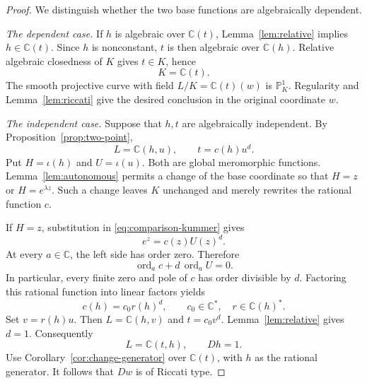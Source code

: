 \documentclass[10pt,a4paper]{amsart}
\newcommand{\C}{\mathbb C}
\newcommand{\PP}{\mathbb P}
\newcommand{\ord}{\operatorname{ord}}
\begin{document}
\begin{proof}
We distinguish whether the two base functions are algebraically
dependent.

\smallskip\noindent
\emph{The dependent case.}
If $h$ is algebraic over $\C(t)$, Lemma~\ref{lem:relative} implies
$h\in\C(t)$. Since $h$ is nonconstant, $t$ is then algebraic over
$\C(h)$. Relative algebraic closedness of $K$ gives $t\in K$, hence
\begin{equation}
 K=\C(t).
 \label{eq:equal-bases}
\end{equation}
The smooth projective curve with field $L/K=\C(t)(w)$ is
$\PP^1_K$. Regularity and Lemma~\ref{lem:riccati} give the desired
conclusion in the original coordinate $w$.

\smallskip\noindent
\emph{The independent case.}
Suppose that $h,t$ are algebraically independent. By
Proposition~\ref{prop:two-point},
\begin{equation}
 L=\C(h,u),\qquad t=c(h)u^d.
 \label{eq:comparison-kummer}
\end{equation}
Put $H=\iota(h)$ and $U=\iota(u)$. Both are global meromorphic
functions. Lemma~\ref{lem:autonomous} permits a change of the base
coordinate so that $H=z$ or $H=e^{\lambda z}$. Such a change leaves
$K$ unchanged and merely rewrites the rational function $c$.

If $H=z$, substitution in \eqref{eq:comparison-kummer} gives
\begin{equation}
 e^z=c(z)U(z)^d.
 \label{eq:additive-divisor-identity}
\end{equation}
At every $a\in\C$, the left side has order zero. Therefore
\[
 \ord_a c+d\,\ord_a U=0.
\]
In particular, every finite zero and pole of $c$ has order divisible
by $d$. Factoring this rational function into linear factors yields
\begin{equation}
 c(h)=c_0r(h)^d,
 \qquad c_0\in\C^*,\quad r\in\C(h)^*.
 \label{eq:additive-divisibility}
\end{equation}
Set $v=r(h)u$. Then $L=\C(h,v)$ and $t=c_0v^d$.
Lemma~\ref{lem:relative} gives $d=1$. Consequently
\begin{equation}
 L=\C(t,h),\qquad Dh=1.
 \label{eq:additive-product}
\end{equation}
Use Corollary~\ref{cor:change-generator} over $\C(t)$, with $h$ as
the rational generator. It follows that $Dw$ is of Riccati type.


\end{proof}
\end{document}
